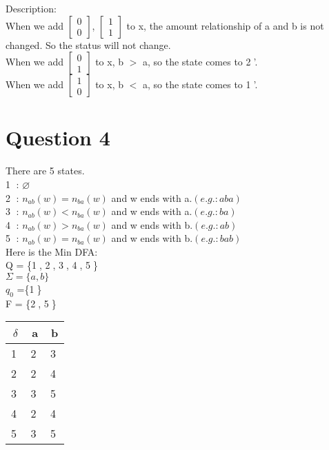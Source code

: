 \documentclass[a4paper]{article}
\begin{document}
Description:\\
When we add $\begin{bmatrix}0\\0\end{bmatrix}$, $\begin{bmatrix}1\\1\end{bmatrix}$ to x, the amount relationship of a and b is not changed. So the status will not change.\\
When we add $\begin{bmatrix}0\\1\end{bmatrix}$ to x, b $>$ a, so the state comes to \textcircled{2}'.\\
When we add $\begin{bmatrix}1\\0\end{bmatrix}$ to x, b $<$ a, so the state comes to \textcircled{1}'.\\


\section{Question 4}
There are 5 states.\\
\textcircled{1} : $\varnothing $  \\
\textcircled{2} : $n_{ab}(w) = n_{ba}(w)$ and w ends with a.$(e.g. : aba)$\\
\textcircled{3} : $n_{ab}(w) < n_{ba}(w)$ and w ends with a.$(e.g. : ba)$\\
\textcircled{4} : $n_{ab}(w) > n_{ba}(w)$ and w ends with b.$(e.g. : ab)$\\
\textcircled{5} : $n_{ab}(w) = n_{ba}(w)$ and w ends with b.$(e.g. : bab)$\\
Here is the Min DFA:\\
Q = \{\textcircled{1}, \textcircled{2}, \textcircled{3}, \textcircled{4}, \textcircled{5}\}\\
$\Sigma = \{a, b\}$\\
$q_{0}$ =\{\textcircled{1}\}\\
F = \{\textcircled{2}, \textcircled{5}\}\\
\begin{tabular}{|c|c|c|}
\hline
$\delta$ & a & b \\ 
\hline
\textcircled{1} & \textcircled{2} & \textcircled{3} \\
\hline
\textcircled{2} & \textcircled{2} & \textcircled{4} \\
\hline
\textcircled{3} & \textcircled{3} & \textcircled{5} \\
\hline
\textcircled{4} & \textcircled{2} & \textcircled{4} \\
\hline
\textcircled{5} & \textcircled{3} & \textcircled{5} \\
\hline
\end{tabular}\\
\end{document}
